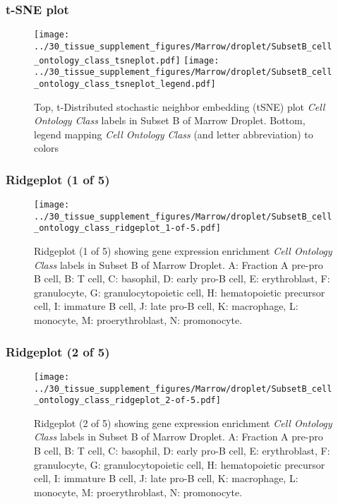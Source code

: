 \clearpage
\subsubsection{t-SNE plot}
\begin{figure}[h]
\centering
\texttt{[image: ../30\_tissue\_supplement\_figures/Marrow/droplet/SubsetB\_cell\_ontology\_class\_tsneplot.pdf]}
\texttt{[image: ../30\_tissue\_supplement\_figures/Marrow/droplet/SubsetB\_cell\_ontology\_class\_tsneplot\_legend.pdf]}
\caption{Top, t-Distributed stochastic neighbor embedding (tSNE) plot  \emph{Cell Ontology Class} labels in Subset B of Marrow Droplet. Bottom, legend mapping \emph{Cell Ontology Class} (and letter abbreviation) to colors}
\end{figure}


\clearpage

\subsubsection{Ridgeplot (1 of 5)}
\begin{figure}[h]
\centering
\texttt{[image: ../30\_tissue\_supplement\_figures/Marrow/droplet/SubsetB\_cell\_ontology\_class\_ridgeplot\_1-of-5.pdf]}

\caption{ Ridgeplot (1 of 5)  showing gene expression enrichment \emph{Cell Ontology Class} labels in Subset B of Marrow Droplet. A: Fraction A pre-pro B cell, B: T cell, C: basophil, D: early pro-B cell, E: erythroblast, F: granulocyte, G: granulocytopoietic cell, H: hematopoietic precursor cell, I: immature B cell, J: late pro-B cell, K: macrophage, L: monocyte, M: proerythroblast, N: promonocyte.}
\end{figure}


\clearpage

\subsubsection{Ridgeplot (2 of 5)}
\begin{figure}[h]
\centering
\texttt{[image: ../30\_tissue\_supplement\_figures/Marrow/droplet/SubsetB\_cell\_ontology\_class\_ridgeplot\_2-of-5.pdf]}

\caption{ Ridgeplot (2 of 5)  showing gene expression enrichment \emph{Cell Ontology Class} labels in Subset B of Marrow Droplet. A: Fraction A pre-pro B cell, B: T cell, C: basophil, D: early pro-B cell, E: erythroblast, F: granulocyte, G: granulocytopoietic cell, H: hematopoietic precursor cell, I: immature B cell, J: late pro-B cell, K: macrophage, L: monocyte, M: proerythroblast, N: promonocyte.}
\end{figure}


